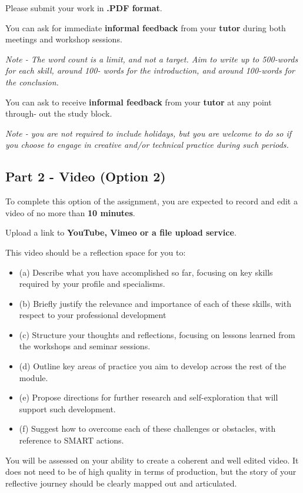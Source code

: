 \documentclass{../../fal_assignment}
\begin{document}
Please submit your work in \textbf{.PDF format}.

You can ask for immediate \textbf{informal feedback} from your \textbf{tutor} during both meetings and workshop sessions.

\emph{Note - The word count is a limit, and not a target. Aim to write up to 500-words for each skill, around 100- words for the introduction, and around 100-words for the conclusion.}

You can ask to receive \textbf{informal feedback} from your \textbf{tutor} at any point through- out the study block.

\emph{Note - you are not required to include holidays, but you are welcome to do so if you choose to engage in creative and/or technical practice during such periods.}


\subsection*{Part 2 - Video (Option 2)} 

To complete this option of the assignment, you are expected to record and edit a video of no more than \textbf{10 minutes}. 

Upload a link to \textbf{YouTube, Vimeo or a file upload service}.

This video should be a reflection space for you to:
\begin{itemize}
\item(a) Describe what you have accomplished so far, focusing on key skills required by your profile and specialisms.
\item (b) Briefly justify the relevance and importance of each of these skills, with respect to your professional development
\item(c) Structure your thoughts and reflections, focusing on lessons learned from the workshops and seminar sessions.
\item(d) Outline key areas of practice you aim to develop across the rest of the module.
\item(e) Propose directions for further research and self-exploration that will support such development.
\item (f) Suggest how to overcome each of these challenges or obstacles, with reference to SMART actions.
\end{itemize}
You will be assessed on your ability to create a coherent and well edited video. It does not need to be of high quality in terms of production, but the story of your reflective journey should be clearly mapped out and articulated.
\end{document}
